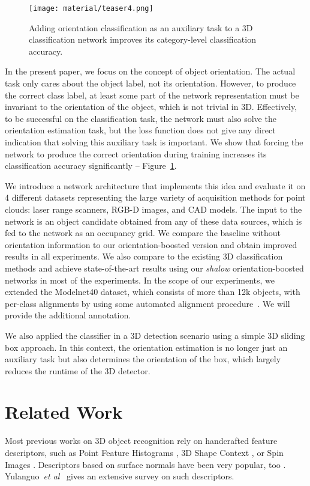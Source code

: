 \documentclass{bmvc2k}
\def\etal{\emph{et al}\bmvaOneDot}
\begin{document}
\begin{figure}[]
  \begin{center}
    \texttt{[image: material/teaser4.png]}
  \end{center}
  \caption{Adding orientation classification as an auxiliary task to a 3D classification network improves its category-level classification accuracy.}
  \label{fig:teaser}
\end{figure}

In the present paper, we focus on the concept of object orientation. The actual task only cares about the object label, not its orientation. However, to produce the correct class label, at least some part of the network representation must be invariant to the orientation of the object, which is not trivial in 3D. Effectively, to be successful on the classification task, the network must also solve the orientation estimation task, but the loss function does not give any direct indication that solving this auxiliary task is important.
We show that forcing the network to produce the correct orientation during training increases its classification accuracy significantly -- Figure~\ref{fig:teaser}.

We introduce a network architecture that implements this idea and evaluate it on 4 different datasets representing the large variety of acquisition methods for point clouds: laser range scanners, RGB-D images, and CAD models.
The input to the network is an object candidate obtained from any of these data sources, which is fed to the network as an occupancy grid.
We compare the baseline without orientation information to our orientation-boosted version and obtain improved results in all experiments. We also compare to the existing 3D classification methods and achieve state-of-the-art results using our \textit{shalow} orientation-boosted networks in most of the experiments.
In the scope of our experiments, we extended the Modelnet40 dataset, which consists of more than 12k objects, with per-class alignments by using some automated alignment procedure~\cite{Sedaghat2015}. We will provide the additional annotation. 

We also applied the classifier in a 3D detection scenario using a simple 3D sliding box approach. In this context, the orientation estimation is no longer just an auxiliary task but also determines the orientation of the box, which largely reduces the runtime of the 3D detector. 

\section{Related Work}
Most previous works on 3D object recognition rely on handcrafted feature descriptors, such as
Point Feature Histograms \cite{rusu_learning_2008,Rusu2009}, 3D Shape Context \cite{Kortgen2003a}, or Spin Images \cite{johnson1999using}. Descriptors based on surface normals have been very popular, too \cite{Horn1984,PattersonIV2008}. Yulanguo~\etal~\cite{yulanguo_3d_2014} gives an extensive survey on such descriptors.
\end{document}
